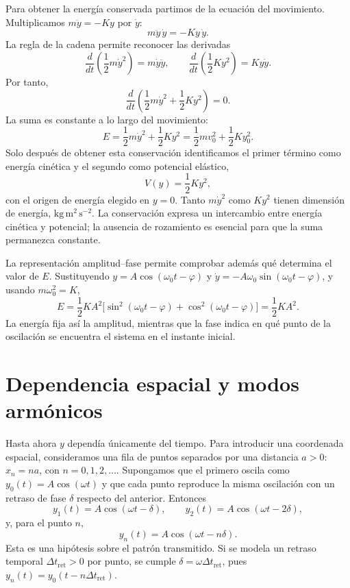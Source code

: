 Para obtener la energía conservada partimos de la ecuación del
movimiento. Multiplicamos $m\ddot y=-Ky$ por $\dot y$:
\[
m\ddot y\,\dot y=-Ky\,\dot y.
\]
La regla de la cadena permite reconocer las derivadas
\[
\frac{d}{dt}\left(\frac12m\dot y^2\right)=m\dot y\ddot y,
\qquad
\frac{d}{dt}\left(\frac12Ky^2\right)=Ky\dot y.
\]
Por tanto,
\begin{equation}
\frac{d}{dt}\left(\frac12m\dot y^2+\frac12Ky^2\right)=0.
\label{eq:conservacion-oscilador}
\end{equation}
La suma es constante a lo largo del movimiento:
\begin{equation}
E=\frac12m\dot y^2+\frac12Ky^2
=\frac12mv_0^2+\frac12Ky_0^2.
\label{eq:energia-oscilador}
\end{equation}
Solo después de obtener esta conservación identificamos el primer término
como energía cinética y el segundo como potencial elástico,
\[
V(y)=\frac12Ky^2,
\]
con el origen de energía elegido en $y=0$. Tanto $m\dot y^2$ como $Ky^2$
tienen dimensión de energía, $\mathrm{kg\,m^2\,s^{-2}}$.
La conservación expresa un intercambio entre energía cinética y potencial;
la ausencia de rozamiento es esencial para que la suma permanezca constante.

La representación amplitud--fase permite comprobar además qué determina
el valor de $E$. Sustituyendo $y=A\cos(\omega_0t-\varphi)$ y
$\dot y=-A\omega_0\sin(\omega_0t-\varphi)$, y usando $m\omega_0^2=K$,
\[
E=\frac12KA^2\bigl[\sin^2(\omega_0t-\varphi)+
\cos^2(\omega_0t-\varphi)\bigr]=\frac12KA^2.
\]
La energía fija así la amplitud, mientras que la fase indica en qué punto
de la oscilación se encuentra el sistema en el instante inicial.

\section{Dependencia espacial y modos armónicos}

Hasta ahora $y$ dependía únicamente del tiempo. Para introducir una
coordenada espacial, consideramos una fila de puntos separados
por una distancia $a>0$: $x_n=na$, con $n=0,1,2,\ldots$.
Supongamos que el primero
oscila como $y_0(t)=A\cos(\omega t)$ y que cada punto reproduce la misma
oscilación con un retraso de fase $\delta$ respecto del anterior. Entonces
\[
y_1(t)=A\cos(\omega t-\delta),\qquad
y_2(t)=A\cos(\omega t-2\delta),
\]
y, para el punto $n$,
\[
y_n(t)=A\cos(\omega t-n\delta).
\]
Esta es una hipótesis sobre el patrón transmitido. Si se modela un retraso
temporal $\Delta t_{\mathrm{ret}}>0$ por punto, se cumple
$\delta=\omega\Delta t_{\mathrm{ret}}$, pues
$y_n(t)=y_0(t-n\Delta t_{\mathrm{ret}})$.

